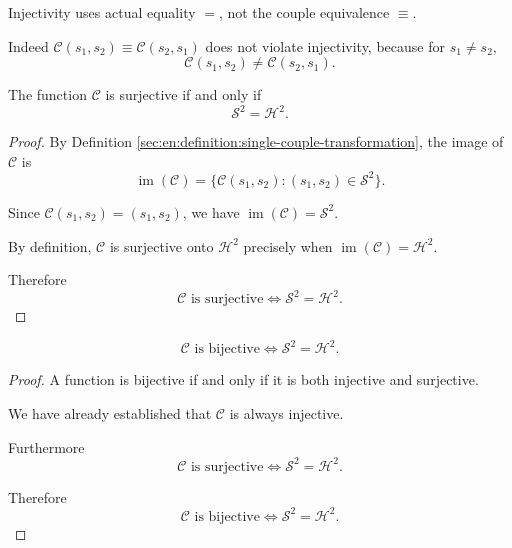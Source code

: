 \begin{corollary}
    Injectivity uses actual equality $=$, not the couple equivalence $\equiv$.

    Indeed $\mathcal C(s_1,s_2)\equiv\mathcal C(s_2,s_1)$ does not violate injectivity, because for $s_1\ne s_2$,
    $$\mathcal C(s_1,s_2)\ne\mathcal C(s_2,s_1).$$
\end{corollary}

\begin{proposition}
    \begin{statement}
        The function $\mathcal C$ is surjective if and only if
        $$\mathcal S^2=\mathcal H^2.$$
    \end{statement}
   
    \begin{proof}
        By Definition \ref{sec:en:definition:single-couple-transformation}, the image of $\mathcal C$ is
        $$\operatorname{im}(\mathcal C)
        =
        \{\mathcal C(s_1,s_2):(s_1,s_2)\in\mathcal S^2\}.$$

        Since $\mathcal C(s_1,s_2)=(s_1,s_2)$, we have $\operatorname{im}(\mathcal C)=\mathcal S^2.$

        By definition, $\mathcal C$ is surjective onto $\mathcal H^2$ precisely when $\operatorname{im}(\mathcal C)=\mathcal H^2.$

        Therefore 
        $$\mathcal C\text{ is surjective}\iff\mathcal S^2=\mathcal H^2.$$
    \end{proof}
\end{proposition}

\begin{proposition}
    \begin{statement}
        $$\mathcal C\text{ is bijective}
            \iff
            \mathcal S^2=\mathcal H^2.$$
    \end{statement}
    \begin{proof}
        A function is bijective if and only if it is both injective and surjective.

        We have already established that $\mathcal C$ is always injective.

        Furthermore
        $$\mathcal C\text{ is surjective}
            \iff
            \mathcal S^2=\mathcal H^2.$$

        Therefore
        $$\mathcal C\text{ is bijective}
            \iff
            \mathcal S^2=\mathcal H^2.$$
    \end{proof}
\end{proposition}

